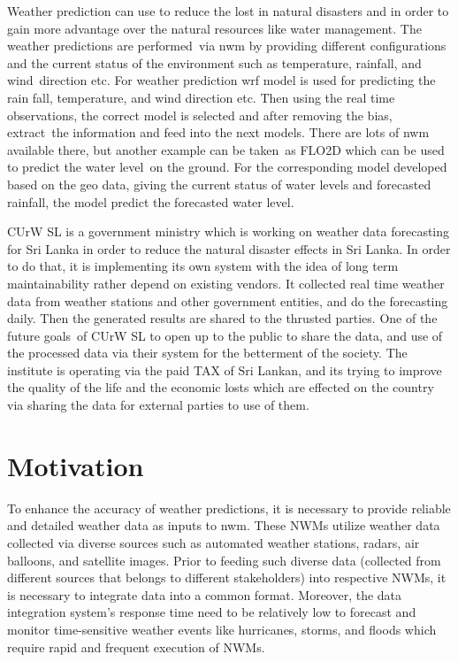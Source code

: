 Weather prediction can use to reduce the lost in natural disasters and in order to gain more advantage over the natural resources like water management. The weather predictions are performed via \acrfull{nwm} by providing different configurations and the current status of the environment such as temperature, rainfall, and wind direction etc. For weather prediction \acrfull{wrf} model is used for predicting the rain fall, temperature, and wind direction etc. Then using the real time observations, the correct model is selected and after removing the bias, extract the information and feed into the next models. There are lots of \acrshort{nwm} available there, but another example can be taken as FLO2D which can be used to predict the water level on the ground. For the corresponding model developed based on the geo data, giving the current status of water levels and forecasted rainfall, the model predict the forecasted water level.

CUrW SL is a government ministry which is working on weather data forecasting for Sri Lanka in order to reduce the natural disaster effects in Sri Lanka. In order to do that, it is implementing its own system with the idea of long term maintainability rather depend on existing vendors. It collected real time weather data from weather stations and other government entities, and do the forecasting daily. Then the generated results are shared to the thrusted parties. One of the future goals of CUrW SL to open up to the public to share the data, and use of the processed data via their system for the betterment of the society. The institute is operating via the paid TAX of Sri Lankan, and its trying to improve the quality of the life and the economic losts which are effected on the country via sharing the data for external parties to use of them.

\section{Motivation}
To enhance the accuracy of weather predictions, it is necessary to provide reliable and detailed weather data as inputs to \acrfull{nwm}. These NWMs utilize  weather data collected via diverse sources such as automated weather stations, radars, air balloons, and satellite images. Prior to feeding such diverse data (collected from different sources that belongs to different stakeholders) into respective NWMs, it is necessary to integrate data into a common format. Moreover, the data integration system’s response time need to be relatively low to forecast and monitor time-sensitive weather events like hurricanes, storms, and floods which require rapid and frequent execution of NWMs.

